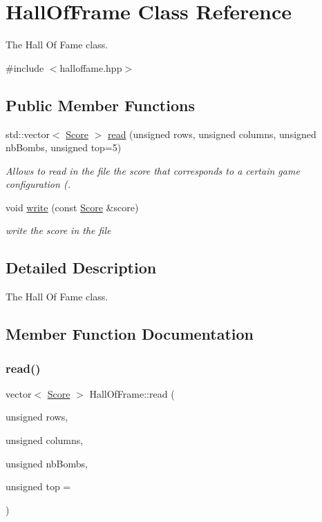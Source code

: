 \hypertarget{class_hall_of_frame}{}\section{Hall\+Of\+Frame Class Reference}
\label{class_hall_of_frame}


The Hall Of Fame class.  




{\ttfamily \#include $<$halloffame.\+hpp$>$}

\subsection*{Public Member Functions}
\begin{DoxyCompactItemize}
\item 
std\+::vector$<$ \hyperlink{class_score}{Score} $>$ \hyperlink{class_hall_of_frame_ae0333d504f861748f16bfd92ec26b7fa}{read} (unsigned rows, unsigned columns, unsigned nb\+Bombs, unsigned top=5)
\begin{DoxyCompactList}\small\item\em Allows to read in the file the score that corresponds to a certain game configuration (. \end{DoxyCompactList}\item 
void \hyperlink{class_hall_of_frame_a78397ce0da28ce790882bb407c8b3915}{write} (const \hyperlink{class_score}{Score} \&score)
\begin{DoxyCompactList}\small\item\em write the score in the file \end{DoxyCompactList}\end{DoxyCompactItemize}


\subsection{Detailed Description}
The Hall Of Fame class. 

\subsection{Member Function Documentation}
\mbox{\label{class_hall_of_frame_ae0333d504f861748f16bfd92ec26b7fa}} 
\subsubsection{\texorpdfstring{read()}{read()}}
{\footnotesize\ttfamily vector$<$ \hyperlink{class_score}{Score} $>$ Hall\+Of\+Frame\+::read (\begin{DoxyParamCaption}\item[{unsigned}]{rows,  }\item[{unsigned}]{columns,  }\item[{unsigned}]{nb\+Bombs,  }\item[{unsigned}]{top = {} }\end{DoxyParamCaption})}



